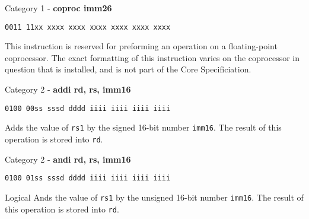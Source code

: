 \documentclass{article}
\begin{document}
\begin{flushleft}
\begin{large}Category 1 - \textbf{coproc imm26}\end{large}
\begin{verbatim}0011 11xx xxxx xxxx xxxx xxxx xxxx xxxx\end{verbatim}
This instruction is reserved for preforming an operation on a floating-point coprocessor.
The exact formatting of this instruction varies on the coprocessor in question that is installed,
and is not part of the Core Specificiation.
\newline\newline
\begin{large}Category 2 - \textbf{addi rd, rs, imm16}\end{large}
\begin{verbatim}0100 00ss sssd dddd iiii iiii iiii iiii\end{verbatim}
Adds the value of \verb|rs1| by the signed 16-bit number \verb|imm16|.
The result of this operation is stored into \verb|rd|.
\newline\newline
\begin{large}Category 2 - \textbf{andi rd, rs, imm16}\end{large}
\begin{verbatim}0100 01ss sssd dddd iiii iiii iiii iiii\end{verbatim}
Logical Ands the value of \verb|rs1| by the unsigned 16-bit number \verb|imm16|.
The result of this operation is stored into \verb|rd|.
\newline\newline
\end{flushleft}
\end{document}
